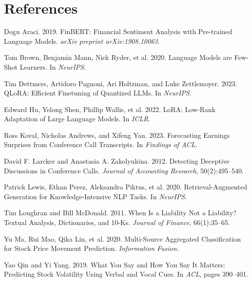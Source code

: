 \documentclass[11pt]{article}
\begin{document}
\section*{References}
\begingroup
\renewcommand{\section}[2]{}
\begin{thebibliography}{}

Dogu Araci. 2019.
FinBERT: Financial Sentiment Analysis with Pre-trained Language Models.
\textit{arXiv preprint arXiv:1908.10063}.

Tom Brown, Benjamin Mann, Nick Ryder, et al. 2020.
Language Models are Few-Shot Learners.
In \textit{NeurIPS}.

Tim Dettmers, Artidoro Pagnoni, Ari Holtzman, and Luke Zettlemoyer. 2023.
QLoRA: Efficient Finetuning of Quantized LLMs.
In \textit{NeurIPS}.

Edward Hu, Yelong Shen, Phillip Wallis, et al. 2022.
LoRA: Low-Rank Adaptation of Large Language Models.
In \textit{ICLR}.

Ross Koval, Nicholas Andrews, and Xifeng Yan. 2023.
Forecasting Earnings Surprises from Conference Call Transcripts.
In \textit{Findings of ACL}.

David F. Larcker and Anastasia A. Zakolyukina. 2012.
Detecting Deceptive Discussions in Conference Calls.
\textit{Journal of Accounting Research}, 50(2):495--540.

Patrick Lewis, Ethan Perez, Aleksandra Piktus, et al. 2020.
Retrieval-Augmented Generation for Knowledge-Intensive NLP Tasks.
In \textit{NeurIPS}.

Tim Loughran and Bill McDonald. 2011.
When Is a Liability Not a Liability? Textual Analysis, Dictionaries, and 10-Ks.
\textit{Journal of Finance}, 66(1):35--65.

Yu Ma, Rui Mao, Qika Lin, et al. 2020.
Multi-Source Aggregated Classification for Stock Price Movement Prediction.
\textit{Information Fusion}.

Yao Qin and Yi Yang. 2019.
What You Say and How You Say It Matters: Predicting Stock Volatility Using Verbal and Vocal Cues.
In \textit{ACL}, pages 390--401.


\end{thebibliography}
\end{document}
